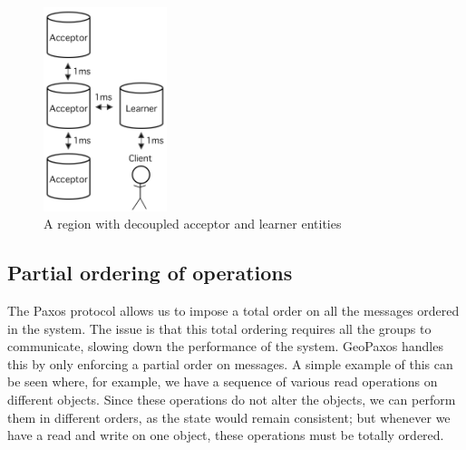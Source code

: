 \begin{figure}[htb]
  \centering
  \includegraphics[width=0.32\textwidth,height=\textheight,keepaspectratio]{img/decoupling_good.png}
  \caption{A region with decoupled acceptor and learner entities}
  \label{fig:decoupling_good}
\end{figure}




\subsection{Partial ordering of operations}
The Paxos protocol allows us to impose a total order on all the messages ordered in the system. The issue is that this total ordering requires all the groups to communicate, slowing down the performance of the system. GeoPaxos handles this by only enforcing a partial order on messages.
A simple example of this can be seen where, for example, we have a sequence of various read operations on different objects. Since these operations do not alter the objects, we can perform them in different orders, as the state would remain consistent; but whenever we have a read and write on one object, these operations must be totally ordered.

